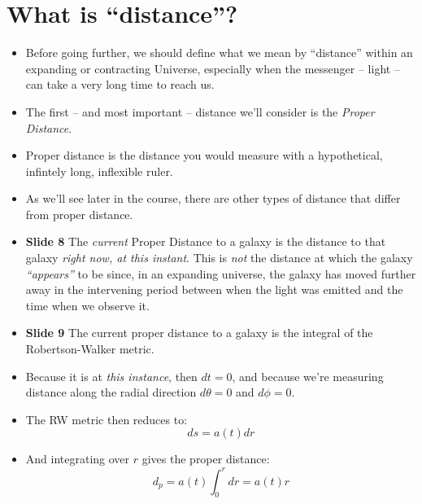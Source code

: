 \documentclass[11pt]{article}
\begin{document}
\section{What is ``distance''?}
\begin{itemize}
\item Before going further, we should define what we mean by ``distance'' within an expanding or contracting Universe, especially when the messenger -- light -- can take a very long time to reach us.
\item The first -- and most important -- distance we'll consider is the {\it Proper Distance}.
\item Proper distance is the distance you would measure with a hypothetical, infintely long, inflexible ruler.
\item As we'll see later in the course, there are other types of distance that differ from proper distance.
\item {\bf Slide 8} The {\it current} Proper Distance to a galaxy is the distance to that galaxy {\it right now, at this instant}. This is {\it not} the distance at which the galaxy {\it ``appears''} to be since, in an expanding universe, the galaxy has moved further away in the intervening period between when the light was emitted and the time when we observe it.
\item {\bf Slide 9} The current proper distance to a galaxy is the integral of the Robertson-Walker metric.
\item Because it is at {\it this instance}, then $dt=0$, and because we're measuring distance along the radial direction $d\theta=0$ and $d\phi=0$.
\item The RW metric then reduces to:
\begin{equation}
ds = a(t)dr
\end{equation}
\item And integrating over $r$ gives the proper distance:
\begin{equation}
d_p = a(t)\int_0^r dr = a(t)r
\end{equation}
\end{itemize}
\end{document}
